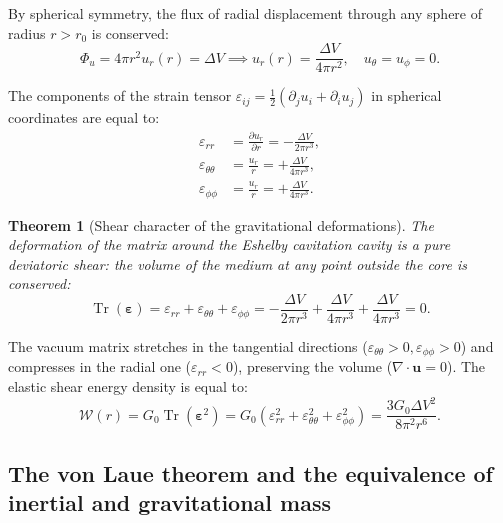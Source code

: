 \documentclass[11pt,a4paper]{article}
\newtheorem{theorem}{Theorem}
\theoremstyle{definition}
\theoremstyle{remark}
\begin{document}
By spherical symmetry, the flux of radial displacement through any sphere of radius $r > r_0$ is conserved:
\begin{equation}
	\Phi_u = 4\pi r^2 u_r(r) = \Delta V \implies u_r(r) = \frac{\Delta V}{4\pi r^2}, \quad u_\theta = u_\phi = 0.
	\label{eq:radial_displacement_eshelby}
\end{equation}

The components of the strain tensor $\varepsilon_{ij} = \frac{1}{2}(\partial_j u_i + \partial_i u_j)$ in spherical coordinates are equal to:
\begin{align}
	\varepsilon_{rr} &= \frac{\partial u_r}{\partial r} = -\frac{\Delta V}{2\pi r^3}, \label{eq:strain_rr} \\
	\varepsilon_{\theta\theta} &= \frac{u_r}{r} = +\frac{\Delta V}{4\pi r^3}, \label{eq:strain_theta} \\
	\varepsilon_{\phi\phi} &= \frac{u_r}{r} = +\frac{\Delta V}{4\pi r^3}. \label{eq:strain_phi}
\end{align}

\begin{theorem}[Shear character of the gravitational deformations]
\label{thm:eshelby_pure_shear}
The deformation of the matrix around the Eshelby cavitation cavity is a pure deviatoric shear: the volume of the medium at any point outside the core is conserved:
\begin{equation}
	\operatorname{Tr}(\boldsymbol{\varepsilon}) = \varepsilon_{rr} + \varepsilon_{\theta\theta} + \varepsilon_{\phi\phi} = -\frac{\Delta V}{2\pi r^3} + \frac{\Delta V}{4\pi r^3} + \frac{\Delta V}{4\pi r^3} = 0.
	\label{eq:eshelby_trace_zero}
\end{equation}
\end{theorem}
The vacuum matrix stretches in the tangential directions ($\varepsilon_{\theta\theta} > 0, \varepsilon_{\phi\phi} > 0$) and compresses in the radial one ($\varepsilon_{rr} < 0$), preserving the volume ($\nabla \cdot \mathbf{u} = 0$). The elastic shear energy density is equal to:
\begin{equation}
	\mathcal{W}(r) = G_0 \operatorname{Tr}(\boldsymbol{\varepsilon}^2) = G_0 \left( \varepsilon_{rr}^2 + \varepsilon_{\theta\theta}^2 + \varepsilon_{\phi\phi}^2 \right) = \frac{3 G_0 \Delta V^2}{8\pi^2 r^6}.
	\label{eq:eshelby_energy_density}
\end{equation}

\subsection{The von Laue theorem and the equivalence of inertial and gravitational mass}
\end{document}
